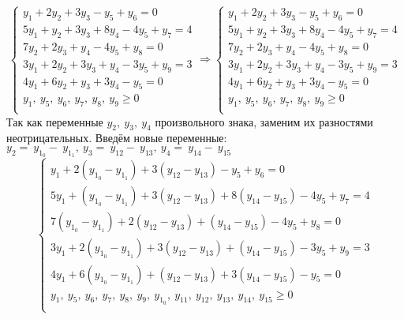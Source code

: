 \documentclass{article}
\begin{document}
\begin{equation*}
\begin{cases}
  y_1 + 2y_2 + 3y_3 - y_5 + y_6 = 0\\
  5y_1 + y_2 + 3y_3 + 8y_4 - 4y_5 + y_7 = 4\\
  7y_2 + 2y_3 + y_4 - 4y_5 + y_8 = 0\\
  3y_1 + 2y_2 + 3y_3 + y_4 - 3y_5 + y_9 = 3\\
  4y_1 + 6y_2 + y_3 + 3y_4 - y_5 = 0\\
  y_1, ~y_5, ~y_6, ~y_7, ~y_8, ~y_9 \ge 0\\
 \end{cases}    
 \Rightarrow
 \begin{cases}
  y_1 + 2y_2 + 3y_3 - y_5 + y_6 = 0\\
  5y_1 + y_2 + 3y_3 + 8y_4 - 4y_5 + y_7 = 4\\
  7y_2 + 2y_3 + y_4 - 4y_5 + y_8 = 0\\
  3y_1 + 2y_2 + 3y_3 + y_4 - 3y_5 + y_9 = 3\\
  4y_1 + 6y_2 + y_3 + 3y_4 - y_5 = 0\\
  y_1, ~y_5, ~y_6, ~y_7, ~y_8, ~y_9 \ge 0\\
 \end{cases}    
\end{equation*}
Так как переменные $y_2, ~y_3, ~y_4$ произвольного знака, заменим их разностями неотрицательных. Введём новые переменные: $y_2 = ~y_1_0 - ~y_1_1, ~y_3 = ~y_{12} - ~y_{13}, ~y_4 = ~y_{14} - ~y_{15}$
\begin{equation*}
\begin{cases}
  y_1 + 2(y_1_0 - y_1_1) + 3(y_{12} - y_{13}) - y_5 + y_6 = 0\\
  5y_1 + (y_1_0 - y_1_1) + 3(y_{12} - y_{13}) + 8(y_{14} - y_{15}) - 4y_5 + y_7 = 4\\
  7(y_1_0 - y_1_1) + 2(y_{12} - y_{13}) + (y_{14} - y_{15}) - 4y_5 + y_8 = 0\\
  3y_1 + 2(y_1_0 - y_1_1) + 3(y_{12} - y_{13}) + (y_{14} - y_{15}) - 3y_5 + y_9 = 3\\
  4y_1 + 6(y_1_0 - y_1_1) + (y_{12} - y_{13}) + 3(y_{14} - y_{15}) - y_5 = 0\\
  y_1, ~y_5, ~y_6, ~y_7, ~y_8, ~y_9, ~y_1_0, ~y_{11}, ~y_{12}, ~y_{13}, ~y_{14}, ~y_{15} \ge 0\\
 \end{cases}      
\end{equation*}
\end{document}
